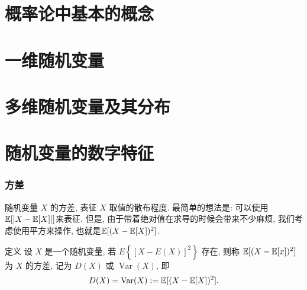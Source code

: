 
\usepackage{ctex}
\usepackage{pifont}
\usepackage{cleveref}
\usepackage{pstricks}
\usepackage{pgfplots}





\part{概率论中基本的概念}


\begin{shaded}
    
\end{shaded}


\begin{shaded}
    
\end{shaded}

\part{一维随机变量}





\part{多维随机变量及其分布}





\part{随机变量的数字特征}




\section{方差}
随机变量 $X$ 的方差, 表征 $X$ 取值的散布程度. 最简单的想法是: 可以使用$\mathbb E[|X-\mathbb E[X]|]$来表征. 但是, 由于带着绝对值在求导的时候会带来不少麻烦, 我们考虑使用平方来操作, 也就是$\mathbb E[(X-\mathbb E[X])^2]$. 

\begin{definition}
    定义 设 $X$ 是一个随机变量, 若 $E\left\{[X-E(X)]^2\right\}$ 存在, 则称 $\mathbb E[(X-\mathbb E[x])^2]$ 为 $X$ 的方差, 记为 $D(X)$ 或 $\operatorname{Var}(X)$, 即
$$
D(X)=\operatorname{Var}(X):=\mathbb E[(X-\mathbb E[X])^2].
$$
\end{definition}

